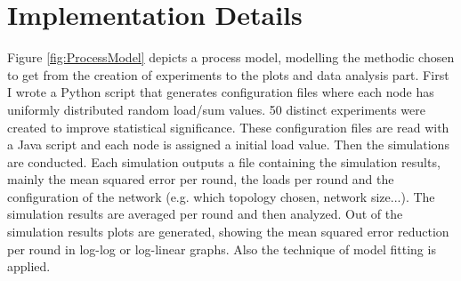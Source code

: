 
\section{Implementation Details}\label{sec:implementationdetails}
Figure \ref{fig:ProcessModel} depicts a process model, modelling the methodic chosen to get from the creation of experiments to the plots and data analysis part. First I wrote a Python script that generates configuration files where each node has uniformly distributed random load/sum values. 50 distinct experiments were created to improve statistical significance. These configuration files are read with a Java script and each node is assigned a initial load value. Then the simulations are conducted. Each simulation outputs a file containing the simulation results, mainly the mean squared error per round, the loads per round and the configuration of the network (e.g. which topology chosen, network size...). The simulation results are averaged per round and then analyzed. Out of the simulation results plots are generated, showing the mean squared error reduction per round in log-log or log-linear graphs. Also the technique of model fitting is applied.

